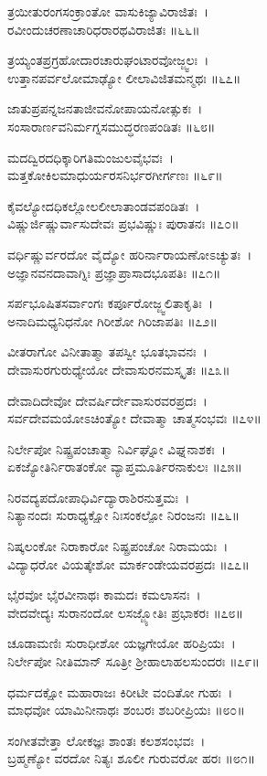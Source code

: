 ತ್ರಯೀತುರಂಗಸಂಕ್ರಾಂತೋ ವಾಸುಕಿಜ್ಯಾವಿರಾಜಿತಃ~।\\
ರವೀಂದುಚರಣಾಚಾರಿಧರಾರಥವಿರಾಜಿತಃ ॥೬೬॥

	ತ್ರಯ್ಯಂತಪ್ರಗ್ರಹೋದಾರಚಾರುಘಂಟಾರವೋಜ್ಜ್ವಲಃ~।\\
	ಉತ್ತಾನಪರ್ವಲೋಮಾಢ್ಯೋ ಲೀಲಾವಿಜಿತಮನ್ಮಥಃ ॥೬೭॥

ಜಾತುಪ್ರಪನ್ನಜನತಾಜೀವನೋಪಾಯನೋತ್ಸುಕಃ~।\\
ಸಂಸಾರಾರ್ಣವನಿರ್ಮಗ್ನಸಮುದ್ಧರಣಪಂಡಿತಃ ॥೬೮॥

	ಮದದ್ವಿರದಧಿಕ್ಕಾರಿಗತಿಮಂಜುಲವೈಭವಃ~।\\
	ಮತ್ತಕೋಕಿಲಮಾಧುರ್ಯರಸನಿರ್ಭರಗೀರ್ಗಣಃ ॥೬೯॥

ಕೈವಲ್ಯೋದಧಿಕಲ್ಲೋಲಲೀಲಾತಾಂಡವಪಂಡಿತಃ~।\\
ವಿಷ್ಣುರ್ಜಿಷ್ಣುರ್ವಾಸುದೇವಃ ಪ್ರಭವಿಷ್ಣುಃ ಪುರಾತನಃ ॥೭೦॥

	ವರ್ಧಿಷ್ಣುರ್ವರದೋ ವೈದ್ಯೋ ಹರಿರ್ನಾರಾಯಣೋಽಚ್ಯುತಃ~।\\
	ಅಜ್ಞಾನವನದಾವಾಗ್ನಿಃ ಪ್ರಜ್ಞಾಪ್ರಾಸಾದಭೂಪತಿಃ ॥೭೧॥

ಸರ್ಪಭೂಷಿತಸರ್ವಾಂಗಃ ಕರ್ಪೂರೋಜ್ಜ್ವಲಿತಾಕೃತಿಃ~।\\
ಅನಾದಿಮಧ್ಯನಿಧನೋ ಗಿರೀಶೋ ಗಿರಿಜಾಪತಿಃ ॥೭೨॥

	ವೀತರಾಗೋ ವಿನೀತಾತ್ಮಾ ತಪಸ್ವೀ ಭೂತಭಾವನಃ~।\\
	ದೇವಾಸುರಗುರುಧ್ಯೇಯೋ ದೇವಾಸುರನಮಸ್ಕೃತಃ ॥೭೩॥

ದೇವಾದಿದೇವೋ ದೇವರ್ಷಿರ್ದೇವಾಸುರವರಪ್ರದಃ~।\\
ಸರ್ವದೇವಮಯೋಽಚಿಂತ್ಯೋ ದೇವಾತ್ಮಾ ಚಾತ್ಮಸಂಭವಃ ॥೭೪॥

	ನಿರ್ಲೇಪೋ ನಿಷ್ಪ್ರಪಂಚಾತ್ಮಾ ನಿರ್ವಿಘ್ನೋ ವಿಘ್ನನಾಶಕಃ~।\\
	ಏಕಜ್ಯೋತಿರ್ನಿರಾತಂಕೋ ವ್ಯಾಪ್ತಮೂರ್ತಿರನಾಕುಲಃ ॥೭೫॥

ನಿರವದ್ಯಪದೋಪಾಧಿರ್ವಿದ್ಯಾರಾಶಿರನುತ್ತಮಃ~।\\
ನಿತ್ಯಾನಂದಃ ಸುರಾಧ್ಯಕ್ಷೋ ನಿಃಸಂಕಲ್ಪೋ ನಿರಂಜನಃ ॥೭೬॥

	ನಿಷ್ಕಲಂಕೋ ನಿರಾಕಾರೋ ನಿಷ್ಪ್ರಪಂಚೋ ನಿರಾಮಯಃ~।\\
	ವಿದ್ಯಾಧರೋ ವಿಯತ್ಕೇಶೋ ಮಾರ್ಕಂಡೇಯವರಪ್ರದಃ ॥೭೭॥

ಭೈರವೋ ಭೈರವೀನಾಥಃ ಕಾಮದಃ ಕಮಲಾಸನಃ~।\\
ವೇದವೇದ್ಯಃ ಸುರಾನಂದೋ ಲಸಜ್ಜ್ಯೋತಿಃ ಪ್ರಭಾಕರಃ ॥೭೮॥

	ಚೂಡಾಮಣಿಃ ಸುರಾಧೀಶೋ ಯಜ್ಞಗೇಯೋ ಹರಿಪ್ರಿಯಃ~।\\
	ನಿರ್ಲೇಪೋ ನೀತಿಮಾನ್ ಸೂತ್ರೀ ಶ್ರೀಹಾಲಾಹಲಸುಂದರಃ ॥೭೯॥

ಧರ್ಮದಕ್ಷೋ ಮಹಾರಾಜಃ ಕಿರೀಟೀ ವಂದಿತೋ ಗುಹಃ~।\\
ಮಾಧವೋ ಯಾಮಿನೀನಾಥಃ ಶಂಬರಃ ಶಬರೀಪ್ರಿಯಃ ॥೮೦॥

	ಸಂಗೀತವೇತ್ತಾ ಲೋಕಜ್ಞಃ ಶಾಂತಃ ಕಲಶಸಂಭವಃ~।\\
	ಬ್ರಹ್ಮಣ್ಯೋ ವರದೋ ನಿತ್ಯಃ ಶೂಲೀ ಗುರುವರೋ ಹರಃ ॥೮೧॥


